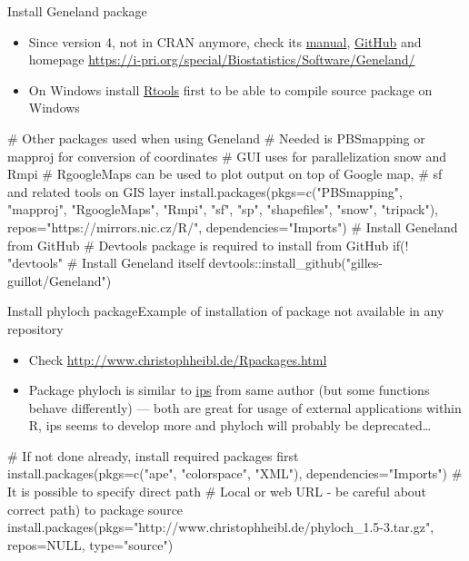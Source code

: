 \documentclass[compress, xelatex, 11pt, xcolor=svgnames, aspectratio=169,
	hyperref={
		bookmarks=true,
		unicode=true,
		colorlinks=true,
		pdftitle={Molecular data in R},
		plainpages=false,
		pdfauthor={Vojtech Zeisek},
		pdfsubject={Course about phylogeny and evolution in R},
		pdfcreator={XeLaTeX},
		pdfkeywords={R, evolution, phylogeny, molecular data},
		linkcolor=Crimson, %
		anchorcolor=Magenta, %
		citecolor=Magenta, %
		filecolor=Magenta, %
		menucolor=Magenta, %
		urlcolor=DodgerBlue, %
		},
	url={hyphens, lowtilde} %
	]{beamer}
\begin{document}
\begin{frame}[fragile]{Install Geneland package}
	\label{Geneland}
	\begin{itemize}
		\item Since version 4, not in CRAN anymore, check its \href{https://i-pri.org/special/Biostatistics/Software/Geneland/Geneland-Doc.pdf}{manual}, \href{https://github.com/gilles-guillot/Geneland}{GitHub} and homepage \url{https://i-pri.org/special/Biostatistics/Software/Geneland/}
		\item On Windows install \href{https://cran.r-project.org/bin/windows/Rtools/}{Rtools} first to be able to compile source package on Windows
	\end{itemize}
	\begin{spluscode}
    # Other packages used when using Geneland
    # Needed is PBSmapping or mapproj for conversion of coordinates
    # GUI uses for parallelization snow and Rmpi
    # RgoogleMaps can be used to plot output on top of Google map,
    # sf and related tools on GIS layer
    install.packages(pkgs=c("PBSmapping", "mapproj", "RgoogleMaps", "Rmpi",
      "sf", "sp", "shapefiles", "snow", "tripack"),
      repos="https://mirrors.nic.cz/R/", dependencies="Imports")
    # Install Geneland from GitHub
    # Devtools package is required to install from GitHub
    if(! "devtools" %
    # Install Geneland itself
    devtools::install_github("gilles-guillot/Geneland")
	\end{spluscode}
\end{frame}

\begin{frame}[fragile]{Install phyloch package}{Example of installation of package not available in any repository}
	\label{phyloch}
	\begin{itemize}
		\item Check \url{http://www.christophheibl.de/Rpackages.html}
		\item Package phyloch is similar to \href{https://CRAN.R-project.org/package=ips}{ips} from same author (but some functions behave differently) --- both are great for usage of external applications within R, ips seems to develop more and phyloch will probably be deprecated\ldots
	\end{itemize}
	\begin{spluscode}
    # If not done already, install required packages first
    install.packages(pkgs=c("ape", "colorspace", "XML"),
      dependencies="Imports")
    # It is possible to specify direct path
    # Local or web URL - be careful about correct path) to package source
    install.packages(pkgs="http://www.christophheibl.de/phyloch_1.5-3.tar.gz",
      repos=NULL, type="source")
	\end{spluscode}
\end{frame}
\end{document}
